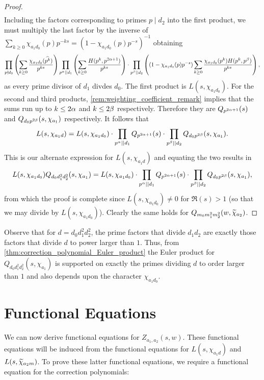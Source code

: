 \documentclass[12pt,reqno,oneside]{amsart}
\begin{document}
\begin{proof}
\begin{align*}
        \end{align*}
        Including the factors corresponding to primes $p \mid d_{2}$ into the first product, we must multiply the last factor by the inverse of $\sum_{k \ge 0}\chi_{a_{1}d_{0}}(p)p^{-ks} = (1-\chi_{a_{1}d_{0}}(p)p^{-s})^{-1}$ obtaining
        \[
            \prod_{p \nmid d_{0}}\left(\sum_{k \ge 0}\frac{\chi_{a_{1}d_{0}}(\widehat{p^{k}})}{p^{ks}}\right)\prod_{p^{\alpha} \mid\mid d_{1}}\left(\sum_{k \ge 0}\frac{H(p^{k},p^{2\alpha+1})}{p^{ks}}\right) \cdot \prod_{p^{\beta} \mid\mid d_{2}}\left((1-\chi_{a_{1}d_{0}}(p)p^{-s})\sum_{k \ge 0}\frac{\chi_{a_{1}d_{0}}(p^{k})H(p^{k},p^{\beta})}{p^{ks}}\right),
        \]
        as every prime divisor of $d_{1}$ divdes $d_{0}$. The first product is $L(s,\chi_{a_{1}d_{0}})$. For the second and third products, \cref{rem:weighting_coefficient_remark} implies that the sums run up to $k \le 2\alpha$ and $k \le 2\beta$ respectively. Therefore they are $Q_{p^{2\alpha+1}}(s)$ and $Q_{d_{0}p^{2\beta}}(s,\chi_{a_{1}})$ respectively. It follows that
        \[
            L(s,\chi_{a_{1}d}) = L(s,\chi_{a_{1}d_{0}}) \cdot \prod_{p^{\alpha} \mid\mid d_{1}}Q_{p^{2\alpha+1}}(s) \cdot \prod_{p^{\beta} \mid\mid d_{2}}Q_{d_{0}p^{2\beta}}(s,\chi_{a_{1}}).
        \]
        This is our alternate expression for $L(s,\chi_{a_{1}d})$ and equating the two results in
        \[
            L(s,\chi_{a_{1}d_{0}})Q_{d_{0}d_{1}^{2}d_{2}^{2}}(s,\chi_{a_{1}}) = L(s,\chi_{a_{1}d_{0}}) \cdot \prod_{p^{\alpha} \mid\mid d_{1}}Q_{p^{2\alpha+1}}(s) \cdot \prod_{p^{\beta} \mid\mid d_{2}}Q_{d_{0}p^{2\beta}}(s,\chi_{a_{1}}),
        \]
        from which the proof is complete since $L(s,\chi_{a_{1}d_{0}}) \neq 0$ for $\Re(s) > 1$ (so that we may divide by $L(s,\chi_{a_{1}d_{0}})$). Clearly the same holds for $Q_{m_{0}m_{1}^{2}m_{2}^{2}}(w,\widetilde{\chi}_{a_{2}})$.
    \end{proof}

    Observe that for $d = d_{0}d_{1}^{2}d_{2}^{2}$, the prime factors that divide $d_{1}d_{2}$ are exactly those factors that divide $d$ to power larger than $1$. Thus, from \cref{thm:correction_polynomial_Euler_product} the Euler product for $Q_{d_{0}d_{1}^{2}d_{2}^{2}}(s,\chi_{a_{1}})$ is supported on exactly the primes dividing $d$ to order larger than $1$ and also depends upon the character $\chi_{a_{1}d_{0}}$.
\section{Functional Equations}
    We can now derive functional equations for $Z_{a_{1},a_{2}}(s,w)$. These functional equations will be induced from the functional equations for $L(s,\chi_{a_{1}d})$ and $L(s,\widetilde{\chi}_{a_{2}m})$. To prove these latter functional equations, we require a functional equation for the correction polynomials:
\end{document}
